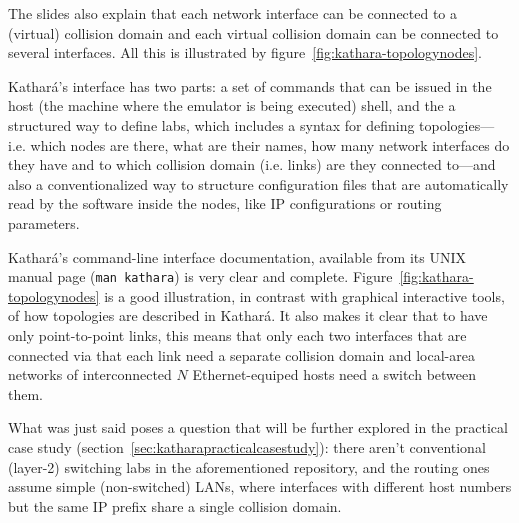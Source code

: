 The slides also explain that each network interface can be connected to a (virtual) collision domain and each virtual collision domain can be connected to several interfaces.
All this is illustrated by figure~\ref{fig:kathara-topologynodes}.

Kathará's interface has two parts: a set of commands that can be issued in the host (the machine where the emulator is being executed) shell, and the a structured way to define labs, which includes a syntax for defining topologies---i.e. which nodes are there, what are their names, how many network interfaces do they have and to which collision domain (i.e. links) are they connected to---and also a conventionalized way to structure configuration files that are automatically read by the software inside the nodes, like IP configurations or routing parameters.

Kathará's command-line interface documentation, available from its UNIX manual page (\hbox{\texttt{man kathara}}) is very clear and complete.
Figure~\ref{fig:kathara-topologynodes} is a good illustration, in contrast with graphical interactive tools, of how topologies are described in Kathará.
It also makes it clear that to have only point-to-point links, this means that only each two interfaces that are connected via that each link need a separate collision domain and local-area networks of interconnected $N$ Ethernet-equiped hosts need a switch between them.

What was just said poses a question that will be further explored in the practical case study (section~\ref{sec:katharapracticalcasestudy}): there aren't conventional (layer-2) switching labs in the aforementioned repository, and the routing ones assume simple (non-switched) LANs, where interfaces with different host numbers but the same IP prefix share a single collision domain.




